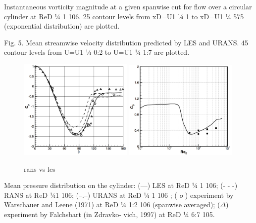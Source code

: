 \documentclass[journal]{new-aiaa}
\begin{document}
Instantaneous vorticity magnitude at a given spanwise cut for flow over a circular cylinder at ReD 1⁄4 1   106. 25 contour levels from xD=U1 1⁄4 1 to xD=U1 1⁄4 575 (exponential distribution) are plotted.

Fig. 5. Mean streamwise velocity distribution predicted by LES and URANS. 45 contour levels from U=U1 1⁄4  0:2 to U=U1 1⁄4 1:7 are plotted.



\begin{figure}[H]
\begin{center}
\includegraphics[width=0.49\textwidth]{Images/logan/catalano2003numerical_CylinderCp.pdf}
\includegraphics[width=0.49\textwidth]{Images/logan/catalano2003numerical_CylinderDrag.pdf}
\caption{ rans vs les \cite{catalano2003numerical} }
\label{fig:cylinderransvsdesvalidation}
\end{center}
\end{figure}


Mean pressure distribution on the cylinder: (—) LES at ReD 1⁄4 1 106; (- - -) RANS at ReD 1⁄41 106; (–.–) URANS at ReD 1⁄4 1   106 ; ( $o$ ) experiment by Warschauer and Leene (1971) at ReD 1⁄4 1:2   106 (spanwise averaged); ($\Delta$) experiment by Falchsbart (in Zdravko- vich, 1997) at ReD 1⁄4 6:7   105.
\end{document}
